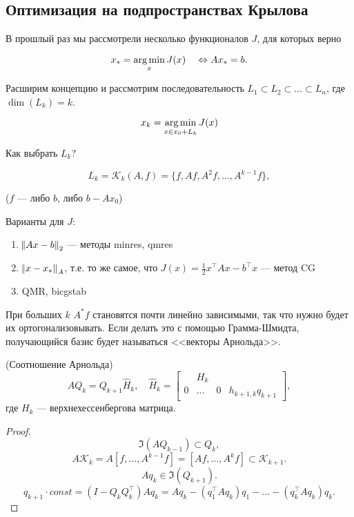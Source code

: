 \subsection{Оптимизация на подпространствах Крылова}

В прошлый раз мы рассмотрели несколько функционалов $J$, для которых верно

\[
    x_* = \operatorname*{\arg \min}_x J(x) \quad\Leftrightarrow A x_* = b.
\]

Расширим концепцию и рассмотрим последовательность
$L_1 \subset L_2 \subset \dots \subset L_n$, где $\dim(L_k) = k$.

\[
    x_k = \operatorname*{\arg \min}_{x \in x_0 + L_k} J(x)
\]

Как выбрать $L_k$?

\[
    L_k = \mathcal{K}_k(A, f) = \{ f, Af, A^2 f, \dots, A^{k - 1} f \},
\]

($f$ --- либо $b$, либо $b - A x_0$)

Варианты для $J$:

\begin{enumerate}
    \item $\norm{A x - b}_2$ --- методы minres, qmres
    \item $\norm{x - x_*}_A$, т.е. то же самое, что
        $J(x) = \frac{1}{2} x^\top A x - b^\top x$ --- метод CG
    \item QMR, bicgstab
\end{enumerate}

При больших $k$ $A^* f$ становятся почти линейно зависимыми, так что нужно будет
их ортогонализовывать. Если делать это с помощью Грамма-Шмидта, получающийся
базис будет называться <<векторы Арнольда>>.

\begin{point} (Соотношение Арнольда)
    \[
        A Q_k = Q_{k + 1} \hat{H}_k, \quad \hat{H}_k = \begin{bmatrix}
            & H_k & \\
            0 & \dots & 0 & h_{k + 1, k} q_{k + 1}
        \end{bmatrix},
    \]
    где $H_k$ --- верхнехессенбергова матрица.
\end{point}

\begin{proof}
    \[
        \Im(A Q_{k - 1}) \subset Q_k,
    \]
    \[
        A \mathcal{K}_k = A [f, \dots, A^{k - 1} f]
        = [A f, \dots, A^k f] \subset \mathcal{K}_{k + 1}.
    \]
    \[
        A q_k \in \Im(Q_{k + 1}).
    \]
    \[
        q_{k + 1} \cdot const = (I - Q_k Q_k^\top) A q_k
        = A q_k - (q_1^\top A q_k) q_1 - \dots - (q_k^\top A q_k) q_k.
    \]
\end{proof}

